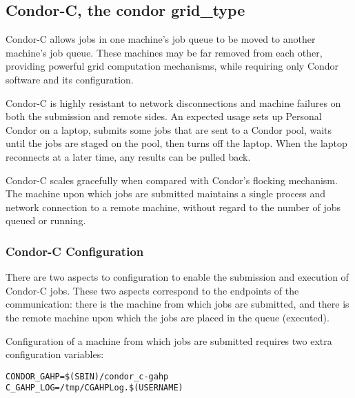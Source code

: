
\subsection{\label{sec:Condor-C}Condor-C, the condor grid\_type }

Condor-C allows jobs in one machine's job queue to
be moved to another machine's job queue.
These machines may be far removed from each other,
providing powerful grid computation mechanisms,
while requiring only Condor software and its configuration.

Condor-C is highly resistant to network disconnections and machine failures on both the submission and remote sides.
An expected usage
sets up Personal Condor on a laptop,
submits some jobs that are sent to a Condor pool,
waits until the jobs are staged on the pool,
then turns off the laptop.
When the laptop reconnects at a later time,
any results can be pulled back.

Condor-C scales gracefully when compared with Condor's flocking
mechanism.
The machine upon which jobs are submitted
maintains a single process and network connection to a remote machine,
without regard to the number
of jobs queued or running.

\subsubsection{\label{sec:Condor-C-Config}Condor-C Configuration}
There are two aspects to configuration to enable the
submission and execution of Condor-C jobs.
These two aspects correspond to the endpoints of the 
communication: there is the machine from which jobs are
submitted, and there is the remote machine upon which the
jobs are placed in the queue (executed).

Configuration of a machine from which jobs are submitted
requires two extra configuration variables:

\footnotesize
\begin{verbatim}
CONDOR_GAHP=$(SBIN)/condor_c-gahp
C_GAHP_LOG=/tmp/CGAHPLog.$(USERNAME)
\end{verbatim}
\normalsize

